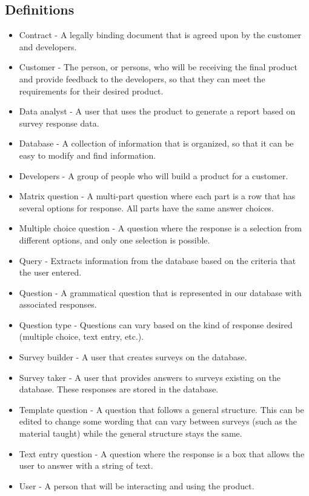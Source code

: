 \documentclass[letterpaper,10pt,titlepage, draftclsnofoot,onecolumn]{IEEEtran}
\begin{document}
\subsection{Definitions}
\begin{itemize}
\item Contract - A legally binding document that is agreed upon by the customer and developers.  %
\item Customer - The person, or persons, who will be receiving the final product and provide feedback to the developers, so that they can meet the requirements for their desired product. 
\item Data analyst - A user that uses the product to generate a report based on survey response data.
\item Database - A collection of information that is organized, so that it can be easy to modify and find information. 
\item Developers - A group of people who will build a product for a customer.
\item Matrix question - A multi-part question where each part is a row that has several options for response. All parts have the
same answer choices.
\item Multiple choice question - A question where the response is a selection from different options, and only one selection
is possible.
\item Query - Extracts information from the database based on the criteria that the user entered.
\item Question - A grammatical question that is represented in our database with associated responses.
\item Question type - Questions can vary based on the kind of response desired (multiple choice, text entry, etc.). %
\item Survey builder - A user that creates surveys on the database.
\item Survey taker - A user that provides answers to surveys existing on the database. These responses are stored in
the database.
\item Template question - A question that follows a general structure. This can be edited to change some wording that can
vary between surveys (such as the material taught) while the general structure stays the same.
\item Text entry question - A question where the response is a box that allows the user to answer with a string of text.
\item User - A person that will be interacting and using the product.
\end{itemize}
\end{document}
